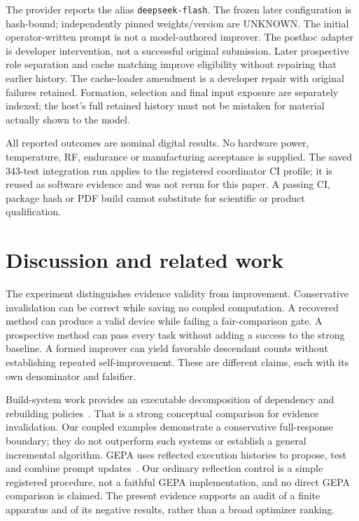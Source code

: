 The provider reports the alias \texttt{deepseek-flash}. The frozen later
configuration is hash-bound; independently pinned weights/version are UNKNOWN.
The initial operator-written prompt is not a model-authored improver. The
posthoc adapter is developer intervention, not a successful original submission.
Later prospective role separation and cache matching improve eligibility
without repairing that earlier history. The cache-loader amendment is a
developer repair with original failures retained. Formation, selection and
final input exposure are separately indexed; the host's full retained history
must not be mistaken for material actually shown to the model.

All reported outcomes are nominal digital results. No hardware power,
temperature, RF, endurance or manufacturing acceptance is supplied. The saved
343-test integration run applies to the registered coordinator CI profile;
it is reused as software evidence and was not rerun for this paper. A passing
CI, package hash or PDF build cannot substitute for scientific or product
qualification.

\section{Discussion and related work}
The experiment distinguishes evidence validity from improvement. Conservative
invalidation can be correct while saving no coupled computation. A recovered
method can produce a valid device while failing a fair-comparison gate. A
prospective method can pass every task without adding a success to the strong
baseline. A formed improver can yield favorable descendant counts without
establishing repeated self-improvement. These are different claims, each with
its own denominator and falsifier.

Build-system work provides an executable decomposition of dependency and
rebuilding policies~\cite{mokhov2018}. That is a strong conceptual comparison
for evidence invalidation. Our coupled examples demonstrate a conservative
full-response boundary; they do not outperform such systems or establish a
general incremental algorithm. GEPA uses reflected execution histories to
propose, test and combine prompt updates~\cite{agrawal2026}. Our ordinary
reflection control is a simple registered procedure, not a faithful GEPA
implementation, and no direct GEPA comparison is claimed. The present evidence
supports an audit of a finite apparatus and of its negative results, rather
than a broad optimizer ranking.

